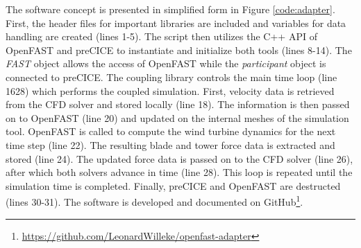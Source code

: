 The software concept is presented in simplified form in Figure \ref{code:adapter}. First, the header files for important libraries are included and variables for data handling are created (lines 1-5). The script then utilizes the C++ API of OpenFAST and preCICE to instantiate and initialize both tools (lines 8-14). The \textit{FAST} object allows the access of OpenFAST while the \textit{participant} object is connected to preCICE. The coupling library controls the main time loop (line 1628) which performs the coupled simulation. First, velocity data is retrieved from the CFD solver and stored locally (line 18). The information is then passed on to OpenFAST (line 20) and updated on the internal meshes of the simulation tool. OpenFAST is called to compute the wind turbine dynamics for the next time step (line 22). The resulting blade and tower force data is extracted and stored (line 24). The updated force data is passed on to the CFD solver (line 26), after which both solvers advance in time (line 28). This loop is repeated until the simulation time is completed. Finally, preCICE and OpenFAST are destructed (lines 30-31). The software is developed and documented on GitHub\footnote{\url{https://github.com/LeonardWilleke/openfast-adapter}}. 

